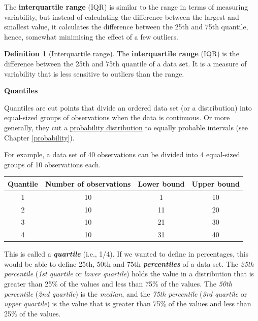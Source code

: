 \documentclass[
]{book}
\newenvironment{callouttitle}{}{}
\theoremstyle{definition}
\newtheorem{definition}{Definition}[chapter]
\theoremstyle{definition}
\theoremstyle{definition}
\theoremstyle{definition}
\theoremstyle{remark}
\begin{document}
The \textbf{interquartile range} (IQR) is similar to the range in terms of measuring variability, but instead of calculating the difference between the largest and smallest value, it calculates the difference between the 25th and 75th quantile, hence, somewhat minimising the effect of a few outliers.

\begin{definition}[Interquartile range]
\protect\hypertarget{def:defIQR}{}\label{def:defIQR}The \textbf{interquartile range} (IQR) is the difference between the 25th and 75th quantile of a data set. It is a measure of variability that is less sensitive to outliers than the range.
\end{definition}

\hypertarget{calloutquantile}{}
\begin{callout}

\begin{callouttitle}
\textbf{Quantiles}

\end{callouttitle}

\nopagebreak

Quantiles are cut points that divide an ordered data set (or a distribution) into equal-sized groups of observations when the data is continuous. Or more generally, they cut a \protect\hyperlink{probability}{probability distribution} to equally probable intervals (see Chapter \ref{probability}).

For example, a data set of 40 observations can be divided into 4 equal-sized groups of 10 observations each.

\begin{longtable}[]{@{}cccc@{}}
\toprule()
Quantile & Number of observations & Lower bound & Upper bound \\
\midrule()
\endhead
1 & 10 & 1 & 10 \\
2 & 10 & 11 & 20 \\
3 & 10 & 21 & 30 \\
4 & 10 & 31 & 40 \\
\bottomrule()
\end{longtable}

This is called a \textbf{\emph{quartile}} (i.e., 1/4). If we wanted to define in percentages, this would be able to define 25th, 50th and 75th \textbf{\emph{percentiles}} of a data set. The \emph{25th percentile} (\emph{1st quartile} or \emph{lower quartile}) holds the value in a distribution that is greater than 25\% of the values and less than 75\% of the values. The \emph{50th percentile} (\emph{2nd quartile}) is the \emph{median}, and the \emph{75th percentile} (\emph{3rd quartile} or \emph{upper quartile}) is the value that is greater than 75\% of the values and less than 25\% of the values.


\end{callout}
\end{document}
